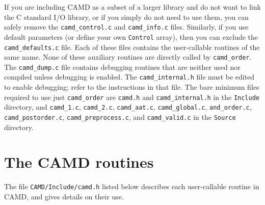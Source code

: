 \documentclass[11pt]{article}
\begin{document}
If you are including CAMD as a subset of a larger library and do not want
to link the C standard I/O library, or if you simply do not need to use
them, you can safely remove the {\tt camd\_control.c} and {\tt camd\_info.c}
files.  Similarly, if you use default parameters (or define your
own {\tt Control} array), then you can exclude the {\tt camd\_defaults.c}
file.
Each of these files contains the user-callable routines of the same
name.  None of these auxiliary routines are directly called by
{\tt camd\_order}.
The {\tt camd\_dump.c} file contains debugging routines
that are neither used nor compiled unless debugging is enabled.
The {\tt camd\_internal.h} file must be edited to enable debugging;
refer to the instructions in that file.
The bare minimum files required to use just {\tt camd\_order} are
{\tt camd.h} and {\tt camd\_internal.h}
in the {\tt Include} directory,
and
{\tt camd\_1.c},
{\tt camd\_2.c},
{\tt camd\_aat.c},
{\tt camd\_global.c},
{\tt and\_order.c},
{\tt camd\_postorder.c},
{\tt camd\_preprocess.c},
and
{\tt camd\_valid.c}
in the {\tt Source} directory.

\newpage
\section{The CAMD routines}
\label{Primary}

The file {\tt CAMD/Include/camd.h} listed below
describes each user-callable routine in CAMD,
and gives details on their use.

{\footnotesize

}

\newpage



\end{document}
